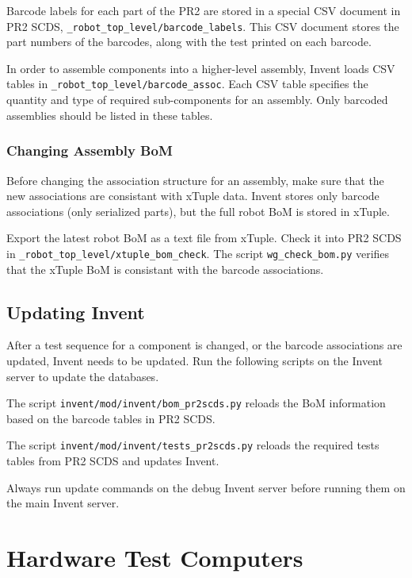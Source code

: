 \documentclass[11pt]{report}
\begin{document}
Barcode labels for each part of the PR2 are stored in a special CSV document in PR2 SCDS, \texttt{\_robot\_top\_level/barcode\_labels}. This CSV document stores the part numbers of the barcodes, along with the test printed on each barcode. 

In order to assemble components into a higher-level assembly, Invent loads CSV tables in \texttt{\_robot\_top\_level/barcode\_assoc}. Each CSV table specifies the quantity and type of required sub-components for an assembly. Only barcoded assemblies should be listed in these tables.


\subsection{Changing Assembly BoM}

Before changing the association structure for an assembly, make sure that the new associations are consistant with xTuple data. Invent stores only barcode associations (only serialized parts), but the full robot BoM is stored in xTuple.

Export the latest robot BoM as a text file from xTuple. Check it into PR2 SCDS in \texttt{\_robot\_top\_level/xtuple\_bom\_check}. The script \texttt{wg\_check\_bom.py} verifies that the xTuple BoM is consistant with the barcode associations.

\section{Updating Invent}

After a test sequence for a component is changed, or the barcode associations are updated, Invent needs to be updated. Run the following scripts on the Invent server to update the databases.

The script \texttt{invent/mod/invent/bom\_pr2scds.py} reloads the BoM information based on the barcode tables in PR2 SCDS. 

The script \texttt{invent/mod/invent/tests\_pr2scds.py} reloads the required tests tables from PR2 SCDS and updates Invent.

Always run update commands on the debug Invent server before running them on the main Invent server.





\chapter{Hardware Test Computers}
\end{document}
